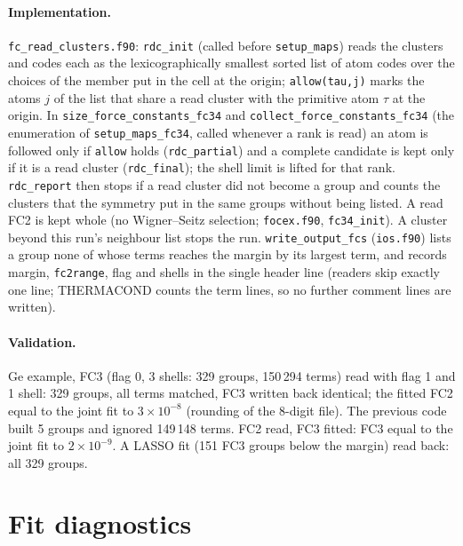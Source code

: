 \documentclass[11pt,a4paper]{article}
\newcommand{\code}[1]{\texttt{#1}}
\begin{document}
\paragraph{Implementation.} \code{fc\_read\_clusters.f90}: \code{rdc\_init} (called before \code{setup\_maps}) reads the
clusters and codes each as the lexicographically smallest sorted list of atom codes over the choices of the member
put in the cell at the origin; \code{allow(tau,j)} marks the atoms $j$ of the list that share a read cluster with
the primitive atom $\tau$ at the origin. In \code{size\_force\_constants\_fc34} and \code{collect\_force\_constants\_fc34}
(the enumeration of \code{setup\_maps\_fc34}, called whenever a rank is read) an atom is followed only if
\code{allow} holds (\code{rdc\_partial}) and a complete candidate is kept only if it is a read cluster
(\code{rdc\_final}); the shell limit is lifted for that rank. \code{rdc\_report} then stops if a read cluster did not
become a group and counts the clusters that the symmetry put in the same groups without being listed. A read FC2 is
kept whole (no Wigner--Seitz selection; \code{focex.f90}, \code{fc34\_init}). A cluster beyond this run's neighbour
list stops the run. \code{write\_output\_fcs} (\code{ios.f90}) lists a group none of whose terms reaches the margin by
its largest term, and records margin, \code{fc2range}, flag and shells in the single header line (readers skip
exactly one line; THERMACOND counts the term lines, so no further comment lines are written).
\paragraph{Validation.} Ge example, FC3 (flag 0, 3 shells: 329 groups, 150\,294 terms) read with flag 1 and 1 shell:
329 groups, all terms matched, FC3 written back identical; the fitted FC2 equal to the joint fit to $3\times10^{-8}$
(rounding of the 8-digit file). The previous code built 5 groups and ignored 149\,148 terms. FC2 read, FC3 fitted:
FC3 equal to the joint fit to $2\times10^{-9}$. A LASSO fit (151 FC3 groups below the margin) read back: all 329 groups.

\section{Fit diagnostics}\label{sec:fitdiag}
\end{document}
